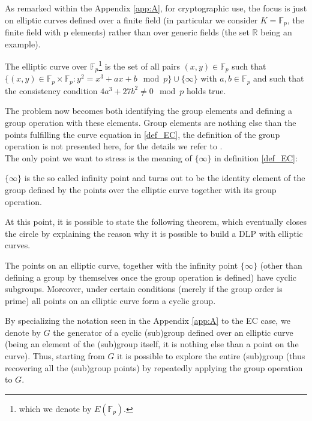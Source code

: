 As remarked within the Appendix \ref{app:A}, for cryptographic use, the focus is just on elliptic curves defined over a finite field (in particular we consider $K = \mathbb{F}_p$, the finite field with p elements) rather than over generic fields (the set $\mathbb{R}$ being an example).
\begin{mydef}
    The elliptic curve over $\mathbb{F}_p$\footnote{which we denote by $E(\mathbb{F}_p)$.} is the set of all pairs $(x,y) \in \mathbb{F}_p$ such that $\{(x,y) \in \mathbb{F}_p \times \mathbb{F}_p: y^2 = x^3 + ax+b \mod p\} \cup \{\infty\}$ with $a,b \in \mathbb{F}_p$ and such that the consistency condition $4 a^3+27b^2 \neq 0 \mod{p}$ holds true.
\end{mydef}
\label{def_EC}
\noindent
The problem now becomes both identifying the group elements and defining a group operation with these elements. Group elements are nothing else than the points fulfilling the curve equation in \ref{def_EC}, the definition of the group operation is not presented here, for the details we refer to \cite{UnderstandingCrypto}.\\
The only point we want to stress is the meaning of $\{\infty \}$ in definition \ref{def_EC}:
\begin{myrem}
    $\{\infty \}$ is the so called infinity point and turns out to be the identity element of the group defined by the points over the elliptic curve together with its group operation.
\end{myrem}
\noindent
At this point, it is possible to state the following theorem, which eventually closes the circle by explaining the reason why it is possible to build a DLP with elliptic curves.
\begin{mytheorem}
    The points on an elliptic curve, together with the infinity point $\{\infty \}$ (other than defining a group by themselves once the group operation is defined) have cyclic subgroups. Moreover, under certain conditions (merely if the group order is prime) all points on an elliptic curve form a cyclic group.
\end{mytheorem}
\begin{myrem}
    By specializing the notation seen in the Appendix \ref{app:A} to the EC case, we denote by $G$ the generator of a cyclic (sub)group defined over an elliptic curve (being an element of the (sub)group itself, it is nothing else than a point on the curve). Thus, starting from $G$ it is possible to explore the entire (sub)group (thus recovering all the (sub)group points) by repeatedly applying the group operation to $G$.
\end{myrem}
